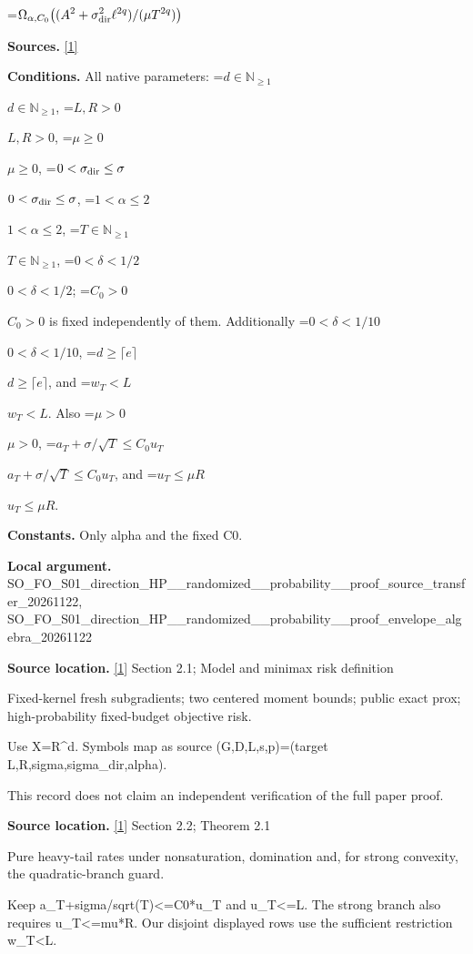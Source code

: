 \documentclass[10pt,a4paper]{article}
\newcommand{\AtlasMath}[1]{\par\begingroup\centering\setbox0=\hbox{$\displaystyle #1$}\ifdim\wd0>1.4\linewidth\typeout{ATLAS WIDE FORMULA: \the\wd0}\fi\ifdim\wd0>\linewidth\resizebox{\linewidth}{!}{\box0}\else\box0\fi\par\endgroup}
\newcommand{\AtlasInlineMath}[1]{\begingroup\setbox0=\hbox{$#1$}\ifdim\wd0>.4\linewidth\endgroup\AtlasMath{#1}\else\endgroup$#1$\fi}
\begin{document}
\AtlasMath{\Omega_{\alpha,C_0}\!\left((A^2+\sigma_{\rm dir}^2\ell^{2q})/(\mu T^{2q})\right)}


\textbf{Sources.} \href{https://arxiv.org/html/2610.00260v2}{[1]}



\textbf{Conditions.} All native parameters: \AtlasInlineMath{d\in\mathbb N_{\ge1}}, \AtlasInlineMath{L,R>0}, \AtlasInlineMath{\mu\ge0}, \AtlasInlineMath{0<\sigma_{\rm dir}\le\sigma}, \AtlasInlineMath{1<\alpha\le2}, \AtlasInlineMath{T\in\mathbb N_{\ge1}}, \AtlasInlineMath{0<\delta<1/2}; \AtlasInlineMath{C_0>0} is fixed independently of them. Additionally \AtlasInlineMath{0<\delta<1/10}, \AtlasInlineMath{d\ge\lceil e\rceil}, and \AtlasInlineMath{w_T<L}. Also \AtlasInlineMath{\mu>0}, \AtlasInlineMath{a_T+\sigma/\sqrt T\le C_0u_T}, and \AtlasInlineMath{u_T\le\mu R}.



\textbf{Constants.} Only alpha and the fixed C0.



\textbf{Local argument.} SO\_FO\_S01\_direction\_HP\_\_\allowbreak{}randomized\_\_probability\_\allowbreak{}\_proof\_source\_transfer\_2\allowbreak{}0261122, SO\_FO\_S01\_direction\_HP\_\_\allowbreak{}randomized\_\_probability\_\allowbreak{}\_proof\_envelope\_algebra\_\allowbreak{}20261122



\textbf{Source location.} \href{https://arxiv.org/html/2610.00260v2}{[1]} Section 2.1; Model and minimax risk definition



Fixed-kernel fresh subgradients; two centered moment bounds; public exact prox; high-probability fixed-budget objective risk.



Use X=R\textasciicircum{}d. Symbols map as source (G,D,L,s,p)=(target L,R,sigma,sigma\_dir,alpha).



This record does not claim an independent verification of the full paper proof.



\textbf{Source location.} \href{https://arxiv.org/html/2610.00260v2}{[1]} Section 2.2; Theorem 2.1



Pure heavy-tail rates under nonsaturation, domination and, for strong convexity, the quadratic-branch guard.



Keep a\_T+sigma/sqrt(T)<=C0*u\_T and u\_T<=L. The strong branch also requires u\_T<=mu*R. Our disjoint displayed rows use the sufficient restriction w\_T<L.
\end{document}
